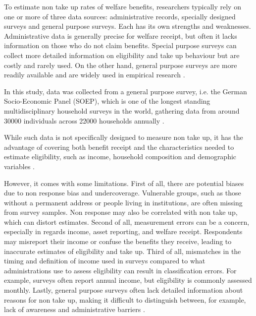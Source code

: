 To estimate non take up rates of welfare benefits, researchers typically rely on one or more of three data sources: administrative records, specially designed surveys and general purpose surveys. Each has its own strengths and weaknesses. Administrative data is generally precise for welfare receipt, but often it lacks information on those who do not claim benefits. Special purpose surveys can collect more detailed information on eligibility and take up behaviour but are costly and rarely used. On the other hand, general purpose surveys are more readily available and are widely used in empirical research \citep{mechelen_who_2017}.

In this study, data was collected from a general purpose survey, i.e. the German Socio-Economic Panel (SOEP), which is one of the longest standing multidisciplinary household surveys in the world, gathering data from around 30000 individuals across 22000 households annually \citep{berlin_diw_nodate}.

While such data is not specifically designed to measure non take up, it has the advantage of covering both benefit receipt and the characteristics needed to estimate eligibility, such as income, household composition and demographic variables \citep{mechelen_who_2017}.

However, it comes with some limitations. First of all, there are potential biases due to non response bias and undercoverage. Vulnerable groups, such as those without a permanent address or people living in institutions, are often missing from survey samples. Non response may also be correlated with non take up, which can distort estimates. Second of all, measurement errors can be a concern, especially in regards income, asset reporting, and welfare receipt. Respondents may misreport their income or confuse the benefits they receive, leading to inaccurate estimates of eligibility and take up. Third of all, mismatches in the timing and definition of income used in surveys compared to what administrations use to assess eligibility can result in classification errors. For example, surveys often report annual income, but eligibility is commonly assessed monthly. Lastly, general purpose surveys often lack detailed information about reasons for non take up, making it difficult to distinguish between, for example, lack of awareness and administrative barriers \citep{mechelen_who_2017}.

